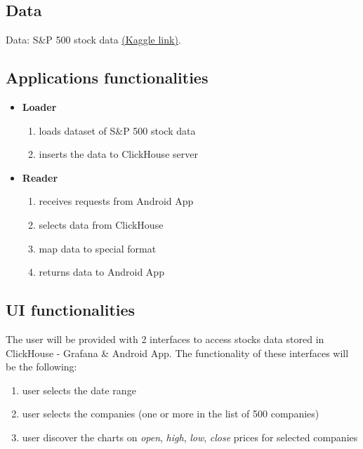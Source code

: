 \documentclass{article}
\begin{document}
\subsection{Data}

Data: S\&P 500 stock data \href{https://www.kaggle.com/kp4920/s-p-500-stock-data-time-series-analysis/data?select=all_stocks_5yr.csv}{(Kaggle link)}.

\subsection{Applications functionalities}

\begin{itemize}
    \item \textbf{Loader}
    
    \begin{enumerate}
        \item loads dataset of S\&P 500 stock data
        \item inserts the data to ClickHouse server
    \end{enumerate}
    
    \item \textbf{Reader}
    
    \begin{enumerate}
        \item receives requests from Android App
        \item selects data from ClickHouse
        \item map data to special format
        \item returns data to Android App
    \end{enumerate}
    
\end{itemize}

\subsection{UI functionalities}

The user will be provided with 2 interfaces to access stocks data stored in ClickHouse - Grafana \& Android App. The functionality of these interfaces will be the following:

\begin{enumerate}
    \item user selects the date range
    \item user selects the companies (one or more in the list of 500 companies)
    \item user discover the charts on \textit{open}, \textit{high}, \textit{low}, \textit{close} prices for selected companies
\end{enumerate}
\end{document}
